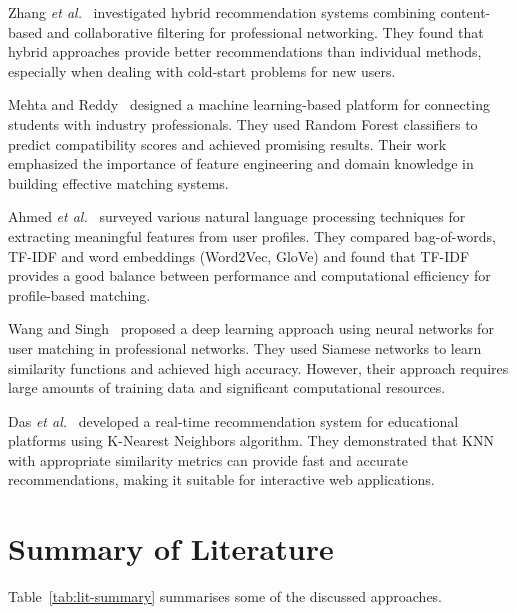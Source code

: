 \documentclass[12pt,a4paper]{report}
\let\origsection\section
\renewcommand{\section}{\needspace{4\baselineskip}\origsection}
\begin{document}
\medskip

\noindent
Zhang \textit{et al.}~\cite{Zhang2023} investigated hybrid recommendation systems combining content-based and collaborative filtering for professional networking. They found that hybrid approaches provide better recommendations than individual methods, especially when dealing with cold-start problems for new users.

\medskip

\noindent
Mehta and Reddy~\cite{Mehta2023} designed a machine learning-based platform for connecting students with industry professionals. They used Random Forest classifiers to predict compatibility scores and achieved promising results. Their work emphasized the importance of feature engineering and domain knowledge in building effective matching systems.

\medskip

\noindent
Ahmed \textit{et al.}~\cite{Ahmed2024} surveyed various natural language processing techniques for extracting meaningful features from user profiles. They compared bag-of-words, TF-IDF and word embeddings (Word2Vec, GloVe) and found that TF-IDF provides a good balance between performance and computational efficiency for profile-based matching.

\medskip

\noindent
Wang and Singh~\cite{Wang2024} proposed a deep learning approach using neural networks for user matching in professional networks. They used Siamese networks to learn similarity functions and achieved high accuracy. However, their approach requires large amounts of training data and significant computational resources.

\medskip

\noindent
Das \textit{et al.}~\cite{Das2024} developed a real-time recommendation system for educational platforms using K-Nearest Neighbors algorithm. They demonstrated that KNN with appropriate similarity metrics can provide fast and accurate recommendations, making it suitable for interactive web applications.

\section{Summary of Literature}

Table~\ref{tab:lit-summary} summarises some of the discussed approaches.
\end{document}
